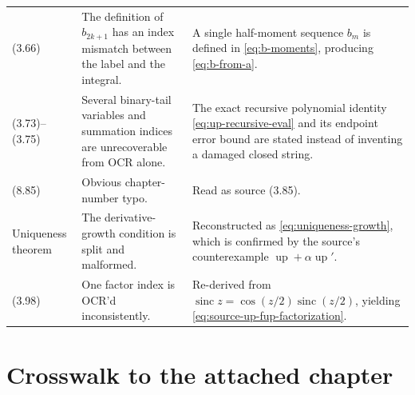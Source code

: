 \documentclass[11pt,oneside]{article}
\theoremstyle{definition}
\theoremstyle{remark}
\newcommand{\Up}{\operatorname{up}}
\newcommand{\sinc}{\operatorname{sinc}}
\begin{document}
\begin{longtable}{>{\raggedright\arraybackslash}p{} >{\raggedright\arraybackslash}p{} >{\raggedright\arraybackslash}p{}}
(3.66) & The definition of \(b_{2k+1}\) has an index mismatch between the label and the integral. & A single half-moment sequence \(b_m\) is defined in \eqref{eq:b-moments}, producing \eqref{eq:b-from-a}.\\
(3.73)--(3.75) & Several binary-tail variables and summation indices are unrecoverable from OCR alone. & The exact recursive polynomial identity \eqref{eq:up-recursive-eval} and its endpoint error bound are stated instead of inventing a damaged closed string.\\
(8.85) & Obvious chapter-number typo. & Read as source (3.85).\\
Uniqueness theorem & The derivative-growth condition is split and malformed. & Reconstructed as \eqref{eq:uniqueness-growth}, which is confirmed by the source's counterexample \(\Up+\alpha\Up'\).\\
(3.98) & One factor index is OCR'd inconsistently. & Re-derived from \(\sinc z=\cos(z/2)\sinc(z/2)\), yielding \eqref{eq:source-up-fup-factorization}.\\
\bottomrule
\end{longtable}

\section{Crosswalk to the attached chapter}
\label{app:crosswalk}
\end{document}
